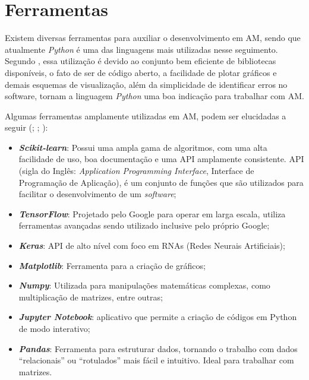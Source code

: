 \section{Ferramentas}
\label{sec:MAFerramentas}
Existem diversas ferramentas para auxiliar o desenvolvimento em AM, sendo que atualmente \textit{Python} é uma das linguagens mais utilizadas nesse seguimento. Segundo , essa utilização é devido ao conjunto bem eficiente de bibliotecas disponíveis, o fato de ser de código aberto, a facilidade de plotar gráficos e demais esquemas de visualização, além da simplicidade de identificar erros no software, tornam a linguagem \textit{Python} uma boa indicação para trabalhar com AM.

Algumas ferramentas amplamente utilizadas em AM, podem ser elucidadas a seguir (\cite{scikitlearn}; \cite{abadi2016tensorflow}; \cite{McKinney2012datapython}):
\begin{itemize}
    \item \textbf{\textit{Scikit-learn}}: Possui uma ampla gama de algoritmos, com uma alta facilidade de uso, boa documentação e uma API amplamente consistente. API (sigla do Inglês: \textit{Application Programming Interface}, Interface de Programação de Aplicação), é um conjunto de funções que são utilizados para facilitar o desenvolvimento de um \textit{software};
    \item \textbf{\textit{TensorFlow}}: Projetado pelo Google para operar em larga escala, utiliza ferramentas avançadas sendo utilizado inclusive pelo próprio Google;
    \item \textbf{\textit{Keras}}: API de alto nível com foco em RNAs (Redes Neurais Artificiais);
    \item \textbf{\textit{Matplotlib}}: Ferramenta para a criação de gráficos;
    \item \textbf{\textit{Numpy}}: Utilizada para manipulações matemáticas complexas, como multiplicação de matrizes, entre outras;
    \item \textbf{\textit{Jupyter Notebook}}: aplicativo que permite a criação de códigos em Python de modo interativo;
    \item \textbf{\textit{Pandas}}: Ferramenta para estruturar dados, tornando o trabalho com dados “relacionais” ou “rotulados” mais fácil e intuitivo. Ideal para trabalhar com matrizes.
\end{itemize}

